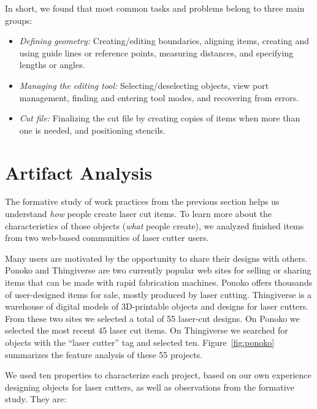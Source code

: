 In short, we found that most common tasks and problems belong to three
main groups:

\begin{itemize}
\item \textit{Defining geometry:} Creating/editing boundaries,
  aligning items, creating and using guide lines or reference points,
  measuring distances, and specifying lengths or angles.
\item \textit{Managing the editing tool:} Selecting/deselecting
  objects, view port management, finding and entering tool modes, and
  recovering from errors.
\item \textit{Cut file:} Finalizing the cut file by creating copies of
  items when more than one is needed, and positioning stencils.
\end{itemize}


\section{Artifact Analysis}
\label{sec:formative-artifact}

The formative study of work practices from the previous section helps
us understand \textit{how} people create laser cut items. To learn
more about the characteristics of those objects (\textit{what} people
create), we analyzed finished items from two web-based communities of
laser cutter users.

Many users are motivated by the opportunity to share their designs
with others. Ponoko and Thingiverse are two currently popular web
sites for selling or sharing items that can be made with rapid
fabrication machines. Ponoko offers thousands of user-designed items
for sale, mostly produced by laser cutting. Thingiverse is a warehouse
of digital models of 3D-printable objects and designs for laser
cutters. From these two sites we selected a total of 55 laser-cut
designs. On Ponoko we selected the most recent 45 laser cut items.  On
Thingiverse we searched for objects with the ``laser cutter'' tag and
selected ten. Figure~\ref{fig:ponoko} summarizes the feature analysis
of these 55 projects.



We used ten properties to characterize each project, based on our own
experience designing objects for laser cutters, as well as
observations from the formative study. They are:

